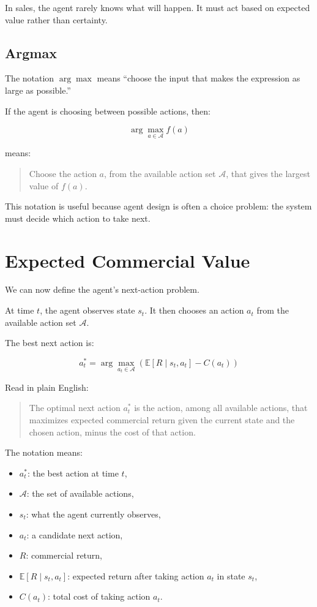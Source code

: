\documentclass[12pt]{article}
\begin{document}
In sales, the agent rarely knows what will happen. It must act based on expected
value rather than certainty.

\subsection{Argmax}

The notation \(\arg\max\) means ``choose the input that makes the expression as
large as possible.''

If the agent is choosing between possible actions, then:

\[
\arg\max_{a \in \mathcal{A}} f(a)
\]

means:

\begin{quote}
    Choose the action \(a\), from the available action set \(\mathcal{A}\), that
    gives the largest value of \(f(a)\).
\end{quote}

This notation is useful because agent design is often a choice problem: the
system must decide which action to take next.

\section{Expected Commercial Value}

We can now define the agent's next-action problem.

At time \(t\), the agent observes state \(s_t\). It then chooses an action
\(a_t\) from the available action set \(\mathcal{A}\).

The best next action is:

\[
a_t^*
=
\arg\max_{a_t \in \mathcal{A}}
\left(
\mathbb{E}[R \mid s_t, a_t]
-
C(a_t)
\right)
\]

Read in plain English:

\begin{quote}
    The optimal next action \(a_t^*\) is the action, among all available actions,
    that maximizes expected commercial return given the current state and the
    chosen action, minus the cost of that action.
\end{quote}

The notation means:

\begin{itemize}
    \item \(a_t^*\): the best action at time \(t\),
    \item \(\mathcal{A}\): the set of available actions,
    \item \(s_t\): what the agent currently observes,
    \item \(a_t\): a candidate next action,
    \item \(R\): commercial return,
    \item \(\mathbb{E}[R \mid s_t, a_t]\): expected return after taking action
    \(a_t\) in state \(s_t\),
    \item \(C(a_t)\): total cost of taking action \(a_t\).
\end{itemize}
\end{document}
